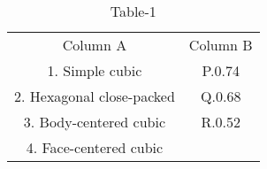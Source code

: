 \begin{table}[H]
     \centering
     \begin{tabular}{c|c}
       Column A    & Column B  \\
         1. Simple cubic   & P.0.74\\
          2. Hexagonal close-packed & Q.0.68\\
          3. Body-centered cubic  & R.0.52\\
          4. Face-centered cubic \\
     \end{tabular}
     \caption{Table-1}
     \label{tab:tables/table1.tex}
 \end{table}